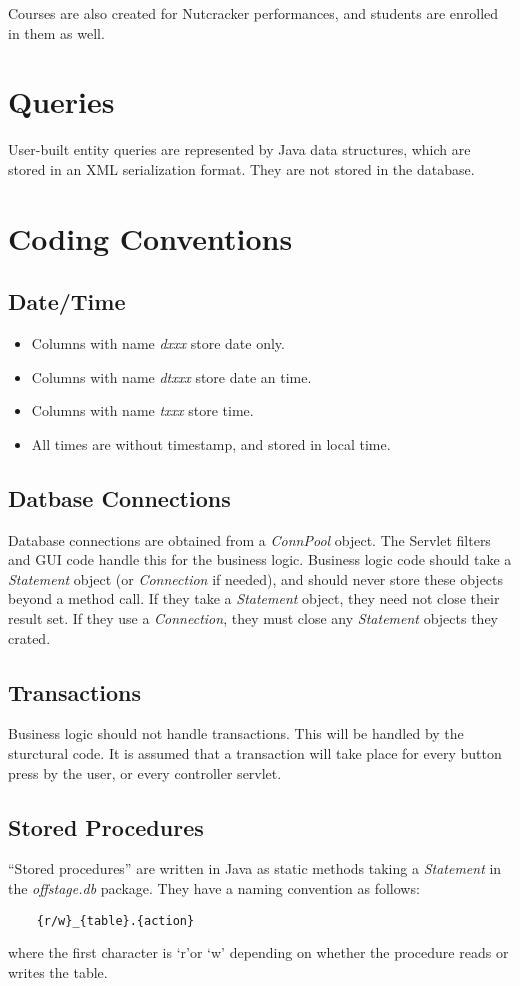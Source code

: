 \documentclass[11pt]{article}
\begin{document}
Courses are also created for Nutcracker performances, and students are
enrolled in them as well.


\section{Queries}

User-built entity queries are represented by Java data structures, which are stored in an XML serialization format.  They are not stored in the database.

\section{Coding Conventions}

\subsection{Date/Time}
\begin{itemize}
 \item Columns with name \emph{dxxx} store date only.
 \item Columns with name \emph{dtxxx} store date an time.
 \item Columns with name \emph{txxx} store time.
 \item All times are without timestamp, and stored in local time.
\end{itemize}

\subsection{Datbase Connections}

Database connections are obtained from a \emph{ConnPool} object.  The Servlet filters and GUI code handle this for the business logic.  Business logic code should take a \emph{Statement} object (or \emph{Connection} if needed), and should never store these objects beyond a method call.  If they take a \emph{Statement} object, they need not close their result set.  If they use a \emph{Connection}, they must close any \emph{Statement} objects they crated.

\subsection{Transactions}

Business logic should not handle transactions.  This will be handled by the sturctural code.  It is assumed that a transaction will take place for every button press by the user, or every controller servlet.

\subsection{Stored Procedures}

``Stored procedures'' are written in Java as static methods taking a \emph{Statement} in the \emph{offstage.db} package.  They have a naming convention as follows:
\begin{verbatim}
    {r/w}_{table}.{action}
\end{verbatim}
 where the first character is `r'or `w' depending on whether the procedure reads or writes the table.
\end{document}
